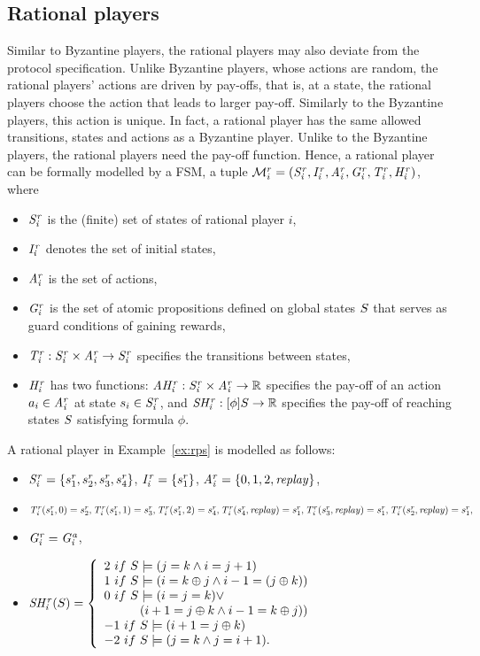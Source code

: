 \subsection{Rational players}
Similar to Byzantine players, the rational players may also deviate from the protocol specification. Unlike Byzantine players, whose actions are random, the rational players' actions are driven by pay-offs, that is, at a state, the rational players choose the action that leads to larger pay-off. Similarly to the Byzantine players, this action is unique. In fact, a rational player has the same allowed transitions, states and actions as a Byzantine player. Unlike to the Byzantine players, the rational players need the pay-off function. Hence, a rational player can be formally modelled by a FSM, a tuple $\mathcal{M}^r_i=(\mathit{S^r_i}, \mathit{I^r_i}, \mathit{A^r_i}, \mathit{G^r_i}, \mathit{T^r_i}, \mathit{H^r_i})$, where
\begin{itemize}
\item $\mathit{S^r_i}$ is the (finite) set of states of rational player $i$, 
\item $\mathit{I^r_i}$ denotes the set of initial states, 
\item $\mathit{A^r_i}$ is the set of actions, 
\item $\mathit{G^r_i}$ is the set of atomic propositions defined on global states $S$ that serves as guard conditions of gaining rewards,
\item $\mathit{T^r_i}: \mathit{S^r_i} \times \mathit{A^r_i} \rightarrow \mathit{S^r_i}$ specifies the transitions between states,
\item $\mathit{H^r_i}$ has two functions: $\mathit{AH^r_i}:\mathit{S^r_i} \times \mathit{A^r_i} \rightarrow \mathbb{R}$ specifies the pay-off of an action $a_i\in \mathit{A^r_i}$ at state $s_i\in \mathit{S^r_i}$, and $\mathit{SH^r_i}: [\phi]S \rightarrow \mathbb{R}$ specifies the pay-off of reaching states $S$ satisfying formula $\phi$.
\end{itemize}

A rational player in Example~\ref{ex:rps} is modelled as follows:
\begin{itemize}
\item
$\mathit{S^r_i}=\{s^r_1, s^r_2, s^r_3, s^r_4\}$, $\mathit{I^r_i}=\{s^r_1\}$, $\mathit{A^r_i}=\{0,1,2, \mathit{replay}\}$, 
\item
$\mathit{T^r_i}(s^r_1, 0) = s^r_2,
\mathit{T^r_i}(s^r_1, 1) = s^r_3,\\
\mathit{T^r_i}(s^r_1, 2) = s^r_4,
\mathit{T^r_i}(s^r_4,\mathit{replay})= s^r_1,\\
\mathit{T^r_i}(s^r_3,\mathit{replay})= s^r_1, 
\mathit{T^r_i}(s^r_2,\mathit{replay})= s^r_1,$
\item
$\mathit{G^r_i}=\mathit{G^a_i}$,
\item 
$\shir(\gs)=\left\{\begin{array}{l}
2\ \mbox{if}\ \gs \sat (j=k \land i = j + 1)\\
1\ \mbox{if}\ \gs \sat (i=k\oplus j \land i-1 = (j\oplus k))\\
0\ \mbox{if}\ \gs \sat (i = j = k)\vee \\
\hfill(i+1=j\oplus k \land i-1=k\oplus j))\\
-1\ \mbox{if}\ \gs \sat (i + 1=j\oplus k)\\
-2\ \mbox{if}\ \gs \sat (j=k \land j = i + 1).\\
\end{array}\right. $
\end{itemize}

